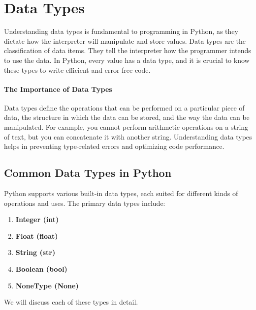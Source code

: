 \documentclass[
  letterpaper,
  DIV=11,
  numbers=noendperiod]{scrreprt}
\providecommand{\tightlist}{%
  \setlength{\itemsep}{0pt}\setlength{\parskip}{0pt}}\usepackage{longtable,booktabs,array}
\begin{document}

\hypertarget{data-types}{%
\chapter{Data Types}\label{data-types}}

Understanding data types is fundamental to programming in Python, as
they dictate how the interpreter will manipulate and store values. Data
types are the classification of data items. They tell the interpreter
how the programmer intends to use the data. In Python, every value has a
data type, and it is crucial to know these types to write efficient and
error-free code.

\hypertarget{the-importance-of-data-types}{%
\subsubsection{The Importance of Data
Types}\label{the-importance-of-data-types}}

Data types define the operations that can be performed on a particular
piece of data, the structure in which the data can be stored, and the
way the data can be manipulated. For example, you cannot perform
arithmetic operations on a string of text, but you can concatenate it
with another string. Understanding data types helps in preventing
type-related errors and optimizing code performance.

\hypertarget{common-data-types-in-python}{%
\section{Common Data Types in
Python}\label{common-data-types-in-python}}

Python supports various built-in data types, each suited for different
kinds of operations and uses. The primary data types include:

\begin{enumerate}
\def\labelenumi{\arabic{enumi}.}
\tightlist
\item
  \textbf{Integer (int)}
\item
  \textbf{Float (float)}
\item
  \textbf{String (str)}
\item
  \textbf{Boolean (bool)}
\item
  \textbf{NoneType (None)}
\end{enumerate}

We will discuss each of these types in detail.
\end{document}
